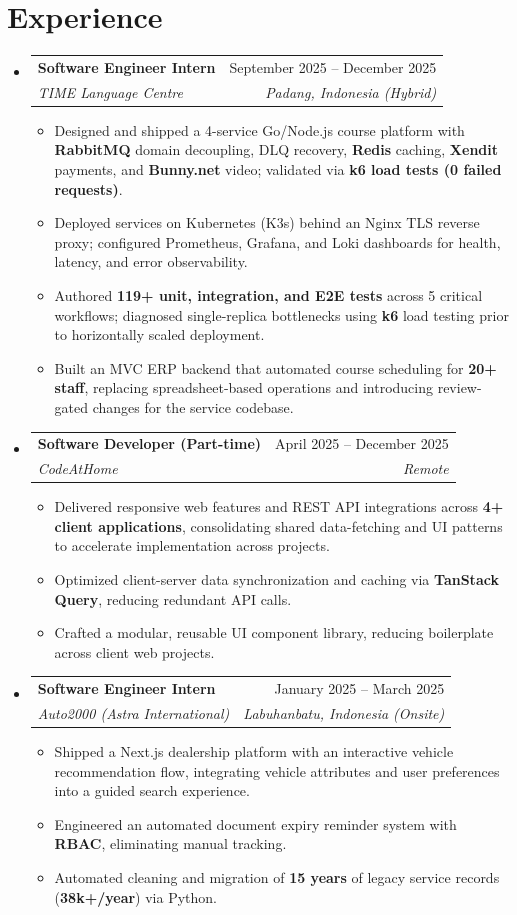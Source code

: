 \documentclass[letterpaper,11pt]{article}
\makeatletter
\newcommand{\resumeItem}[1]{
  \item\small{
    {#1 \vspace{-2pt}}
  }
}
\newcommand{\resumeSubheading}[4]{
  \vspace{-2.5pt}\item
    \begin{tabular*}{0.97\textwidth}[t]{l@{\extracolsep{\fill}}r}
      \textbf{#1} & #2 \\
      \textit{\small#3} & \textit{\small #4} \\
    \end{tabular*}\vspace{-5.5pt}
}
\newcommand{\resumeSubHeadingListStart}{\begin{itemize}[leftmargin=0.15in, label={}, itemsep=0pt]}
\newcommand{\resumeSubHeadingListEnd}{\end{itemize}\vspace{-8.5pt}}
\newcommand{\resumeItemListStart}{\begin{itemize}[noitemsep, topsep=0pt]}
\newcommand{\resumeItemListEnd}{\end{itemize}\vspace{-4.0pt}}
\makeatother
\begin{document}
\section{Experience}
  \resumeSubHeadingListStart
    \resumeSubheading
      {Software Engineer Intern}{September 2025 -- December 2025}
      {TIME Language Centre}{Padang, Indonesia (Hybrid)}
      \resumeItemListStart
        \resumeItem{Designed and shipped a 4-service Go/Node.js course platform with \textbf{RabbitMQ} domain decoupling, DLQ recovery, \textbf{Redis} caching, \textbf{Xendit} payments, and \textbf{Bunny.net} video; validated via \textbf{k6 load tests (0 failed requests)}.}
        \resumeItem{Deployed services on Kubernetes (K3s) behind an Nginx TLS reverse proxy; configured Prometheus, Grafana, and Loki dashboards for health, latency, and error observability.}
        \resumeItem{Authored \textbf{119+ unit, integration, and E2E tests} across 5 critical workflows; diagnosed single-replica bottlenecks using \textbf{k6} load testing prior to horizontally scaled deployment.}
        \resumeItem{Built an MVC ERP backend that automated course scheduling for \textbf{20+ staff}, replacing spreadsheet-based operations and introducing review-gated changes for the service codebase.}
      \resumeItemListEnd 

    \resumeSubheading
      {Software Developer (Part-time)}{April 2025 -- December 2025}
      {CodeAtHome}{Remote}
      \resumeItemListStart
        \resumeItem{Delivered responsive web features and REST API integrations across \textbf{4+ client applications}, consolidating shared data-fetching and UI patterns to accelerate implementation across projects.}
        \resumeItem{Optimized client-server data synchronization and caching via \textbf{TanStack Query}, reducing redundant API calls.}
        \resumeItem{Crafted a modular, reusable UI component library, reducing boilerplate across client web projects.}
      \resumeItemListEnd

    \resumeSubheading
      {Software Engineer Intern}{January 2025 -- March 2025}
      {Auto2000 (Astra International)}{Labuhanbatu, Indonesia (Onsite)}
      \resumeItemListStart
        \resumeItem{Shipped a Next.js dealership platform with an interactive vehicle recommendation flow, integrating vehicle attributes and user preferences into a guided search experience.}
        \resumeItem{Engineered an automated document expiry reminder system with \textbf{RBAC}, eliminating manual tracking.}
        \resumeItem{Automated cleaning and migration of \textbf{15 years} of legacy service records (\textbf{38k+/year}) via Python.}
      \resumeItemListEnd
  \resumeSubHeadingListEnd
\end{document}
